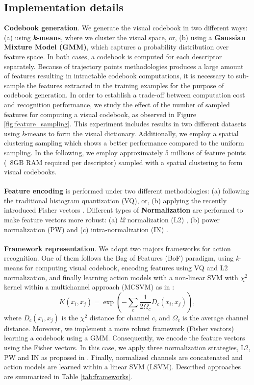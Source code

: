 \subsection{Implementation details}

\textbf{Codebook generation}. We generate the visual codebook in two different ways: (a) using \textbf{\textit{k}-means}, where we cluster the visual space, or, (b) using a \textbf{Gaussian Mixture Model (GMM)}, which captures a probability distribution over feature space. In both cases, a codebook is computed for each descriptor separately. Because of trajectory points methodologies produces a large amount of features resulting in intractable codebook computations, it is necessary to sub-sample the features extracted in the training examples for the purpose of codebook generation. In order to establish a trade-off between computation cost and recognition performance, we study the effect of the number of sampled features for computing a visual codebook, as observed in Figure \ref{fig:feature_sampling}. This experiment includes results in two different datasets using \textit{k}-means to form the visual dictionary. Additionally, we employ a spatial clustering sampling  which shows a better performance compared to the uniform sampling. In the following, we employ approximately 5 millions of feature points (~8GB RAM required per descriptor) sampled with a spatial clustering to form visual codebooks.\\\\
\textbf{Feature encoding} is performed under two different methodologies: (a) following the traditional histogram quantization (VQ), or, (b) applying the recently introduced Fisher vectors \cite{perronnin2010}. Different types of \textbf{Normalization} are performed to make feature vectors more robust: (a) \textit{l2} normalization (L2) \cite{perronnin2010}, (b) power normalization (PW) \cite{perronnin2010} and (c) intra-normalization (IN) \cite{xwang2013}. \\\\
\textbf{Framework representation}. We adopt two majors frameworks for action recognition. One of them follows the Bag of Features (BoF) paradigm, using \textit{k}-means for computing visual codebook, encoding features using VQ and L2 normalization, and finally learning action models with a non-linear SVM with $\chi^2$ kernel within a multichannel approach (MCSVM) as in \cite{zhang2007}:
\begin{equation}
K(x_i,x_j)= \exp(-\sum_c {\frac{1}{2\Omega_c} D_c(x_i,x_j)}),
\label{eq:multichannel}
\end{equation}
where $D_c(x_i,x_j)$ is the $\chi^2$ distance for channel $c$, and $\Omega_c$ is the average channel distance. Moreover, we implement a more robust framework (Fisher vectors) learning a codebook using a GMM. Consequently, we encode the feature vectors using the Fisher vectors. In this case, we apply three normalization strategies, L2, PW and IN as proposed in \cite{xwang2013}. Finally, normalized channels are concatenated and action models are learned within a linear SVM (LSVM). Described approaches are summarized in Table \ref{tab:frameworks}.


